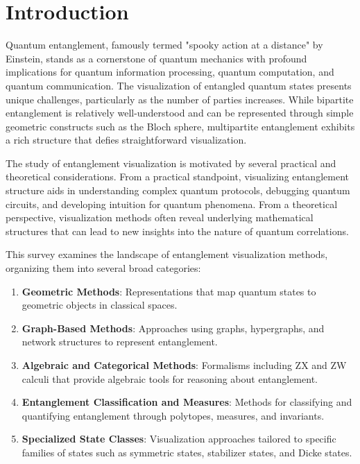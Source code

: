 \documentclass[%
 amsmath,amssymb,
 aps,
rmp,
]{revtex4-2}
\begin{document}
\section{Introduction}
\label{sec:intro}

Quantum entanglement, famously termed "spooky action at a distance" by Einstein, stands as a cornerstone of quantum mechanics with profound implications for quantum information processing, quantum computation, and quantum communication. The visualization of entangled quantum states presents unique challenges, particularly as the number of parties increases. While bipartite entanglement is relatively well-understood and can be represented through simple geometric constructs such as the Bloch sphere, multipartite entanglement exhibits a rich structure that defies straightforward visualization.

The study of entanglement visualization is motivated by several practical and theoretical considerations. From a practical standpoint, visualizing entanglement structure aids in understanding complex quantum protocols, debugging quantum circuits, and developing intuition for quantum phenomena. From a theoretical perspective, visualization methods often reveal underlying mathematical structures that can lead to new insights into the nature of quantum correlations.

This survey examines the landscape of entanglement visualization methods, organizing them into several broad categories:

\begin{enumerate}
	\item \textbf{Geometric Methods}: Representations that map quantum states to geometric objects in classical spaces.
	\item \textbf{Graph-Based Methods}: Approaches using graphs, hypergraphs, and network structures to represent entanglement.
	\item \textbf{Algebraic and Categorical Methods}: Formalisms including ZX and ZW calculi that provide algebraic tools for reasoning about entanglement.
	\item \textbf{Entanglement Classification and Measures}: Methods for classifying and quantifying entanglement through polytopes, measures, and invariants.
	\item \textbf{Specialized State Classes}: Visualization approaches tailored to specific families of states such as symmetric states, stabilizer states, and Dicke states.
\end{enumerate}
\end{document}
